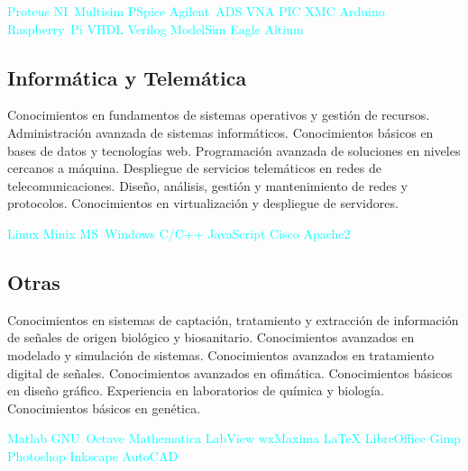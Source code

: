 \documentclass[11pt,a4paper,sans,spanish]{moderncv}
\begin{document}
\begin{center}
\textcolor{cyan}{
Proteus \quad{} NI~Multisim \quad{} PSpice \quad{}
Agilent~ADS \quad{} VNA \quad{}
PIC \quad{} XMC \quad{} Arduino \quad{} Raspberry~Pi \quad{}
VHDL \quad{} Verilog \quad{} ModelSim \quad{}
Eagle \quad{} Altium
}
\end{center}

\subsection{Informática y Telemática}
{Conocimientos en fundamentos de sistemas operativos y gestión de recursos.}\quad
{Administración avanzada de sistemas informáticos.}\quad
{Conocimientos básicos en bases de datos y tecnologías web.}\quad
{Programación avanzada de soluciones en niveles cercanos a máquina.}\quad
{Despliegue de servicios telemáticos en redes de telecomunicaciones. }\quad
{Diseño, análisis, gestión y mantenimiento de redes y protocolos.}\quad
{Conocimientos en virtualización y despliegue de servidores.}\quad

\begin{center}
\textcolor{cyan}{
Linux \quad{} Minix \quad{} MS~Windows \quad{} C/C++ \quad{} JavaScript \quad{} Cisco \quad{} Apache2 
}
\end{center}

\subsection{Otras}
Conocimientos en sistemas de captación, tratamiento y extracción de información de señales de origen biológico y biosanitario.\quad
Conocimientos avanzados en modelado y simulación de sistemas.\quad
Conocimientos avanzados en tratamiento digital de señales.\quad
Conocimientos avanzados en ofimática.\quad
Conocimientos básicos en diseño gráfico.\quad
Experiencia en laboratorios de química y biología.\quad
Conocimientos básicos en genética.\quad


\begin{center}
\textcolor{cyan}{
Matlab \quad{} GNU~Octave \quad{} Mathematica \quad{} LabView \quad{} wxMaxima \quad{} LaTeX \quad{} LibreOffice \quad{} Gimp \quad{} Photoshop \quad{} Inkscape \quad{} AutoCAD
}
\end{center}
\end{document}
